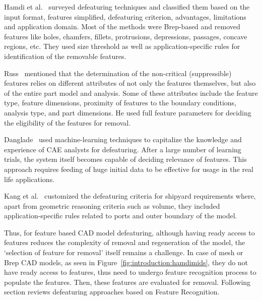 
Hamdi et al.~\cite{Hamdi2012a} surveyed defeaturing techniques and classified them based on the input format, features simplified, defeaturing criterion, advantages, limitations and application domain. Most of the methods were Brep-based and removed features like holes, chamfers, fillets, protrusions, depressions, passages, concave regions, etc. They used size threshold as well as application-specific rules for identification of the removable features.  

Russ~\cite{Russ2012} mentioned that the determination of the non-critical (suppressible) features relies on different attributes of not only the features themselves, but also of the entire part model and analysis. Some of these attributes include the feature type, feature dimensions, proximity of features to the boundary conditions, analysis type, and part dimensions. He used full feature parameters for deciding the eligibility of the features for removal. 

	
	Danglade~\cite{Danglade2013} used machine-learning techniques to capitalize the knowledge and experience of CAE analysts for defeaturing. After a large number of learning trials, the system itself becomes capable of deciding relevance of features. This approach requires feeding of huge initial data to be effective for usage in the real life applications.

	Kang et al.~\cite{Kang2013} customized the defeaturing criteria for shipyard requirements where, apart from geometric reasoning criteria such as volume, they included application-specific rules related to ports and outer boundary of the model.
	
Thus, for feature based CAD model defeaturing, although having ready access to features reduces the complexity of removal and regeneration of the model, the `selection of feature for removal' itself remains a challenge. In case of mesh or Brep CAD models, as seen in Figure~\ref{fig:introduction:hamdimids}, they do not have ready access to features, thus need to undergo feature recognition process to populate the features. Then, these features are evaluated for removal. Following section reviews defeaturing approaches based on Feature Recognition.
	
